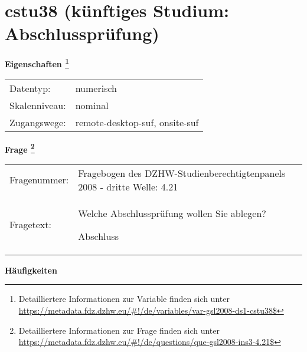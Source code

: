 
    \setcounter{footnote}{0}

    \vspace*{-1.8cm}
	\section{cstu38 (künftiges Studium: Abschlussprüfung)}
	\label{section:cstu38}



    \vspace*{0.5cm}
    \noindent\textbf{Eigenschaften
	\footnote{Detailliertere Informationen zur Variable finden sich unter
		\url{https://metadata.fdz.dzhw.eu/\#!/de/variables/var-gsl2008-ds1-cstu38$}}}\\
	\begin{tabularx}{\hsize}{@{}lX}
	Datentyp: & numerisch \\
	Skalenniveau: & nominal \\
	Zugangswege: &
	  remote-desktop-suf, 
	  onsite-suf
 \\
    \end{tabularx}



				\vspace*{0.5cm}
                \noindent\textbf{Frage
	                \footnote{Detailliertere Informationen zur Frage finden sich unter
		              \url{https://metadata.fdz.dzhw.eu/\#!/de/questions/que-gsl2008-ins3-4.21$}}}\\
				\begin{tabularx}{\hsize}{@{}lX}
					Fragenummer: &
					  Fragebogen des DZHW-Studienberechtigtenpanels 2008 - dritte Welle:
					  4.21
 \\
					Fragetext: & Welche Abschlussprüfung wollen Sie ablegen?\par  Abschluss \\
				\end{tabularx}





        		\vspace*{0.5cm}
                \noindent\textbf{Häufigkeiten}


